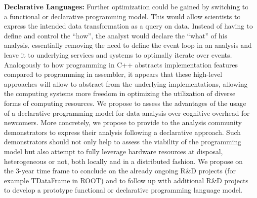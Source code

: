 \documentclass[12pt,a4paper]{article}
\begin{document}
{\bf Declarative Languages:} Further optimization could be gained by switching to a functional or declarative programming model. This would allow scientists to express the intended data transformation as a query on data. Instead of having to define and control the ``how'', the analyst would declare the ``what'' of his analysis, essentially removing the need to define the event loop in an analysis and leave it to underlying services and systems to optimally iterate over events. Analogously to how programming in C++ abstracts implementation features compared to programming in assembler, it appears that these high-level approaches will allow to abstract from the underlying implementations, allowing the computing systems more freedom in optimizing the utilization of diverse forms of computing resources. We propose to assess the advantages of the usage of a declarative programming model for data analysis over cognitive overhead for newcomers. More concretely, we propose to provide to the analysis community demonstrators to express their analysis following a declarative approach. Such demonstrators should not only help to assess the viability of the programming model but also attempt to fully leverage hardware resources at disposal, heterogeneous or not, both locally and in a distributed fashion. We propose on the 3-year time frame to conclude on the already ongoing R\&D projects (for example TDataFrame in ROOT) and to follow up with additional R\&D projects to develop a prototype functional or declarative programming language model. 
\end{document}

